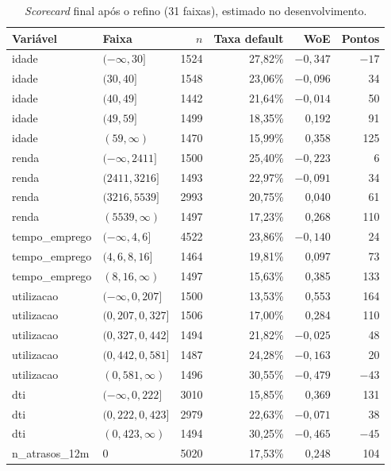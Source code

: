 \documentclass[11pt,a4paper]{article}
\begin{document}
\begin{table}[H]
\centering\footnotesize
\caption{\emph{Scorecard} final após o refino (31 faixas), estimado no desenvolvimento.}
\label{tab:scorecard1}
\begin{tabular}{llrrrr}
\toprule
Variável & Faixa & $n$ & Taxa default & WoE & Pontos \\
\midrule
idade & $(-\infty, 30]$ & 1524 & 27,82\% & $-0{,}347$ & $-17$ \\
idade & $(30, 40]$ & 1548 & 23,06\% & $-0{,}096$ & 34 \\
idade & $(40, 49]$ & 1442 & 21,64\% & $-0{,}014$ & 50 \\
idade & $(49, 59]$ & 1499 & 18,35\% & 0,192 & 91 \\
idade & $(59, \infty)$ & 1470 & 15,99\% & 0,358 & 125 \\
\addlinespace
renda & $(-\infty, 2411]$ & 1500 & 25,40\% & $-0{,}223$ & 6 \\
renda & $(2411, 3216]$ & 1493 & 22,97\% & $-0{,}091$ & 34 \\
renda & $(3216, 5539]$ & 2993 & 20,75\% & 0,040 & 61 \\
renda & $(5539, \infty)$ & 1497 & 17,23\% & 0,268 & 110 \\
\addlinespace
tempo\_emprego & $(-\infty, 4{,}6]$ & 4522 & 23,86\% & $-0{,}140$ & 24 \\
tempo\_emprego & $(4{,}6, 8{,}16]$ & 1464 & 19,81\% & 0,097 & 73 \\
tempo\_emprego & $(8{,}16, \infty)$ & 1497 & 15,63\% & 0,385 & 133 \\
\addlinespace
utilizacao & $(-\infty, 0{,}207]$ & 1500 & 13,53\% & 0,553 & 164 \\
utilizacao & $(0{,}207, 0{,}327]$ & 1506 & 17,00\% & 0,284 & 110 \\
utilizacao & $(0{,}327, 0{,}442]$ & 1494 & 21,82\% & $-0{,}025$ & 48 \\
utilizacao & $(0{,}442, 0{,}581]$ & 1487 & 24,28\% & $-0{,}163$ & 20 \\
utilizacao & $(0{,}581, \infty)$ & 1496 & 30,55\% & $-0{,}479$ & $-43$ \\
\addlinespace
dti & $(-\infty, 0{,}222]$ & 3010 & 15,85\% & 0,369 & 131 \\
dti & $(0{,}222, 0{,}423]$ & 2979 & 22,63\% & $-0{,}071$ & 38 \\
dti & $(0{,}423, \infty)$ & 1494 & 30,25\% & $-0{,}465$ & $-45$ \\
\addlinespace
n\_atrasos\_12m & 0 & 5020 & 17,53\% & 0,248 & 104 \\

\end{tabular}
\end{table}
\end{document}
